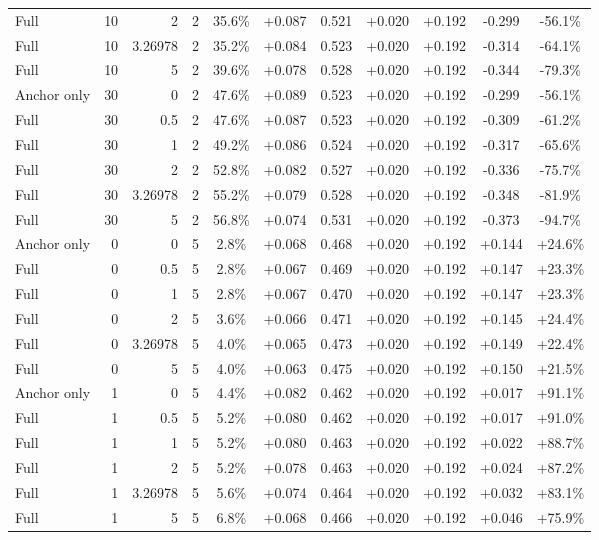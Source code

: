 \begin{table}[htbp]
\begin{tabular}{lrrrccccccc}
Full & 10 & 2 & 2 & 35.6\% & +0.087 & 0.521 & +0.020 & +0.192 & -0.299 & -56.1\% \\
Full & 10 & 3.26978 & 2 & 35.2\% & +0.084 & 0.523 & +0.020 & +0.192 & -0.314 & -64.1\% \\
Full & 10 & 5 & 2 & 39.6\% & +0.078 & 0.528 & +0.020 & +0.192 & -0.344 & -79.3\% \\
Anchor only & 30 & 0 & 2 & 47.6\% & +0.089 & 0.523 & +0.020 & +0.192 & -0.299 & -56.1\% \\
Full & 30 & 0.5 & 2 & 47.6\% & +0.087 & 0.523 & +0.020 & +0.192 & -0.309 & -61.2\% \\
Full & 30 & 1 & 2 & 49.2\% & +0.086 & 0.524 & +0.020 & +0.192 & -0.317 & -65.6\% \\
Full & 30 & 2 & 2 & 52.8\% & +0.082 & 0.527 & +0.020 & +0.192 & -0.336 & -75.7\% \\
Full & 30 & 3.26978 & 2 & 55.2\% & +0.079 & 0.528 & +0.020 & +0.192 & -0.348 & -81.9\% \\
Full & 30 & 5 & 2 & 56.8\% & +0.074 & 0.531 & +0.020 & +0.192 & -0.373 & -94.7\% \\
Anchor only & 0 & 0 & 5 & 2.8\% & +0.068 & 0.468 & +0.020 & +0.192 & +0.144 & +24.6\% \\
Full & 0 & 0.5 & 5 & 2.8\% & +0.067 & 0.469 & +0.020 & +0.192 & +0.147 & +23.3\% \\
Full & 0 & 1 & 5 & 2.8\% & +0.067 & 0.470 & +0.020 & +0.192 & +0.147 & +23.3\% \\
Full & 0 & 2 & 5 & 3.6\% & +0.066 & 0.471 & +0.020 & +0.192 & +0.145 & +24.4\% \\
Full & 0 & 3.26978 & 5 & 4.0\% & +0.065 & 0.473 & +0.020 & +0.192 & +0.149 & +22.4\% \\
Full & 0 & 5 & 5 & 4.0\% & +0.063 & 0.475 & +0.020 & +0.192 & +0.150 & +21.5\% \\
Anchor only & 1 & 0 & 5 & 4.4\% & +0.082 & 0.462 & +0.020 & +0.192 & +0.017 & +91.1\% \\
Full & 1 & 0.5 & 5 & 5.2\% & +0.080 & 0.462 & +0.020 & +0.192 & +0.017 & +91.0\% \\
Full & 1 & 1 & 5 & 5.2\% & +0.080 & 0.463 & +0.020 & +0.192 & +0.022 & +88.7\% \\
Full & 1 & 2 & 5 & 5.2\% & +0.078 & 0.463 & +0.020 & +0.192 & +0.024 & +87.2\% \\
Full & 1 & 3.26978 & 5 & 5.6\% & +0.074 & 0.464 & +0.020 & +0.192 & +0.032 & +83.1\% \\
Full & 1 & 5 & 5 & 6.8\% & +0.068 & 0.466 & +0.020 & +0.192 & +0.046 & +75.9\% \\

\end{tabular}
\end{table}
